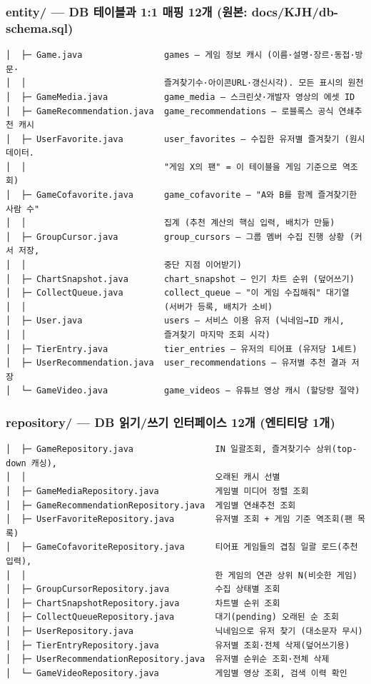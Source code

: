 \documentclass[11pt]{article}
\begin{document}
\subsubsection*{entity/ --- DB 테이블과 1:1 매핑 12개 (원본: docs/KJH/db-schema.sql)}
\begin{Verbatim}[frame=single, fontsize=\small]
│  ├─ Game.java                games — 게임 정보 캐시 (이름·설명·장르·동접·방문·
│  │                           즐겨찾기수·아이콘URL·갱신시각). 모든 표시의 원천
│  ├─ GameMedia.java           game_media — 스크린샷·개발자 영상의 에셋 ID
│  ├─ GameRecommendation.java  game_recommendations — 로블록스 공식 연쇄추천 캐시
│  ├─ UserFavorite.java        user_favorites — 수집한 유저별 즐겨찾기 (원시 데이터.
│  │                           "게임 X의 팬" = 이 테이블을 게임 기준으로 역조회)
│  ├─ GameCofavorite.java      game_cofavorite — "A와 B를 함께 즐겨찾기한 사람 수"
│  │                           집계 (추천 계산의 핵심 입력, 배치가 만듦)
│  ├─ GroupCursor.java         group_cursors — 그룹 멤버 수집 진행 상황 (커서 저장,
│  │                           중단 지점 이어받기)
│  ├─ ChartSnapshot.java       chart_snapshot — 인기 차트 순위 (덮어쓰기)
│  ├─ CollectQueue.java        collect_queue — "이 게임 수집해줘" 대기열
│  │                           (서버가 등록, 배치가 소비)
│  ├─ User.java                users — 서비스 이용 유저 (닉네임→ID 캐시,
│  │                           즐겨찾기 마지막 조회 시각)
│  ├─ TierEntry.java           tier_entries — 유저의 티어표 (유저당 1세트)
│  ├─ UserRecommendation.java  user_recommendations — 유저별 추천 결과 저장
│  └─ GameVideo.java           game_videos — 유튜브 영상 캐시 (할당량 절약)
\end{Verbatim}

\subsubsection*{repository/ --- DB 읽기/쓰기 인터페이스 12개 (엔티티당 1개)}
\begin{Verbatim}[frame=single, fontsize=\small]
│  ├─ GameRepository.java                IN 일괄조회, 즐겨찾기수 상위(top-down 캐싱),
│  │                                     오래된 캐시 선별
│  ├─ GameMediaRepository.java           게임별 미디어 정렬 조회
│  ├─ GameRecommendationRepository.java  게임별 연쇄추천 조회
│  ├─ UserFavoriteRepository.java        유저별 조회 + 게임 기준 역조회(팬 목록)
│  ├─ GameCofavoriteRepository.java      티어표 게임들의 겹침 일괄 로드(추천 입력),
│  │                                     한 게임의 연관 상위 N(비슷한 게임)
│  ├─ GroupCursorRepository.java         수집 상태별 조회
│  ├─ ChartSnapshotRepository.java       차트별 순위 조회
│  ├─ CollectQueueRepository.java        대기(pending) 오래된 순 조회
│  ├─ UserRepository.java                닉네임으로 유저 찾기 (대소문자 무시)
│  ├─ TierEntryRepository.java           유저별 조회·전체 삭제(덮어쓰기용)
│  ├─ UserRecommendationRepository.java  유저별 순위순 조회·전체 삭제
│  └─ GameVideoRepository.java           게임별 영상 조회, 검색 이력 확인
\end{Verbatim}
\end{document}
